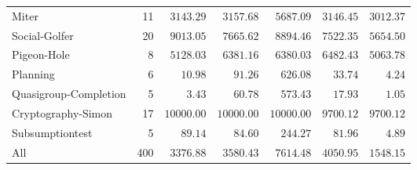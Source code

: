 \begin{tabular}{lr|rrrr|r}
Miter & 11 & \bfseries $3143.29$ & $3157.68$ & $5687.09$ & $3146.45$ & $3012.37$ \\
Social-Golfer & 20 & $9013.05$ & $7665.62$ & $8894.46$ & \bfseries $7522.35$ & $5654.50$ \\
Pigeon-Hole & 8 & \bfseries $5128.03$ & $6381.16$ & $6380.03$ & $6482.43$ & $5063.78$ \\
Planning & 6 & \bfseries $10.98$ & $91.26$ & $626.08$ & $33.74$ & $4.24$ \\
Quasigroup-Completion & 5 & \bfseries $3.43$ & $60.78$ & $573.43$ & $17.93$ & $1.05$ \\
Cryptography-Simon & 17 & $10000.00$ & $10000.00$ & $10000.00$ & \bfseries $9700.12$ & $9700.12$ \\
Subsumptiontest & 5 & $89.14$ & $84.60$ & $244.27$ & \bfseries $81.96$ & $4.89$ \\
\hline All & 400 & \bfseries $3376.88$ & $3580.43$ & $7614.48$ & $4050.95$ & $1548.15$ \\
\bottomrule
\end{tabular}
